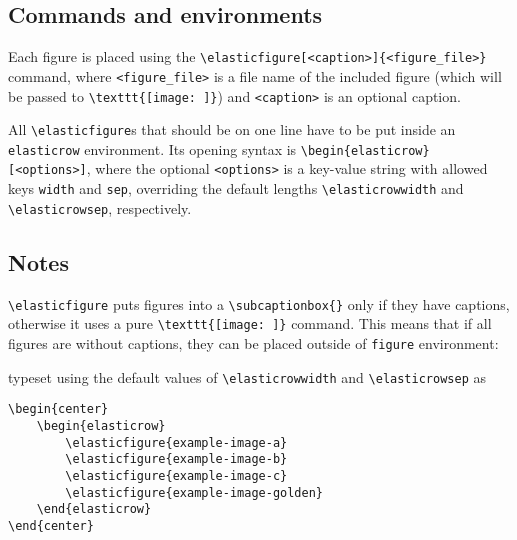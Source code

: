 \documentclass[a4paper]{scrartcl}
\begin{document}
\subsection{Commands and environments}

Each figure is placed using the \verb*|\elasticfigure[<caption>]{<figure_file>}| command, where \verb*|<figure_file>| is a file name of the included figure (which will be passed to \verb*|\texttt{[image: ]}|) and \verb*|<caption>| is an optional caption.

All \verb*|\elasticfigure|s that should be on one line have to be put inside an \verb*|elasticrow| environment.
Its opening syntax is \verb*|\begin{elasticrow}[<options>]|, where the optional \verb*|<options>| is a key-value string with allowed keys \verb*|width| and \verb*|sep|, overriding the default lengths \verb*|\elasticrowwidth| and \verb*|\elasticrowsep|, respectively.

\subsection{Notes}

\verb*|\elasticfigure| puts figures into a \verb*|\subcaptionbox{}| only if they have captions, otherwise it uses a pure \verb*|\texttt{[image: ]}| command.
This means that if all figures are without captions, they can be placed outside of \verb*|figure| environment:

\begin{center}
	\begin{elasticrow}
	\end{elasticrow}
\end{center}
typeset using the default values of \verb*|\elasticrowwidth| and \verb*|\elasticrowsep| as
\begin{verbatim}
\begin{center}
    \begin{elasticrow}
        \elasticfigure{example-image-a}
        \elasticfigure{example-image-b}
        \elasticfigure{example-image-c}
        \elasticfigure{example-image-golden}
    \end{elasticrow}
\end{center}
\end{verbatim}
\end{document}
